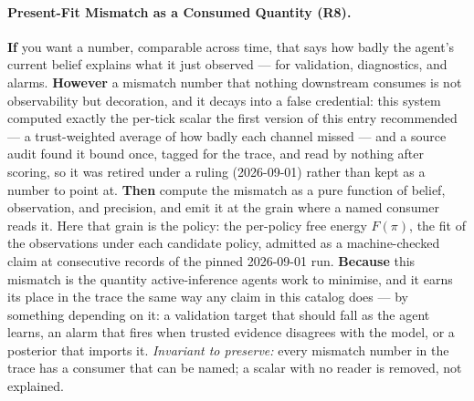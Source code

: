 \paragraph{Present-Fit Mismatch as a Consumed Quantity (R8).} \textbf{If} you want a number, comparable across time, that says how badly the agent's current belief explains what it just observed --- for validation, diagnostics, and alarms. \textbf{However} a mismatch number that nothing downstream consumes is not observability but decoration, and it decays into a false credential: this system computed exactly the per-tick scalar the first version of this entry recommended --- a trust-weighted average of how badly each channel missed --- and a source audit found it bound once, tagged for the trace, and read by nothing after scoring, so it was retired under a ruling (2026-09-01) rather than kept as a number to point at. \textbf{Then} compute the mismatch as a pure function of belief, observation, and precision, and emit it at the grain where a named consumer reads it.  Here that grain is the policy: the per-policy free energy $F(\pi)$, the fit of the observations under each candidate policy, admitted as a machine-checked claim at consecutive records of the pinned 2026-09-01 run. \textbf{Because} this mismatch is the quantity active-inference agents work to minimise, and it earns its place in the trace the same way any claim in this catalog does --- by something depending on it: a validation target that should fall as the agent learns, an alarm that fires when trusted evidence disagrees with the model, or a posterior that imports it.  \emph{Invariant to preserve:} every mismatch number in the trace has a consumer that can be named; a scalar with no reader is removed, not explained.

